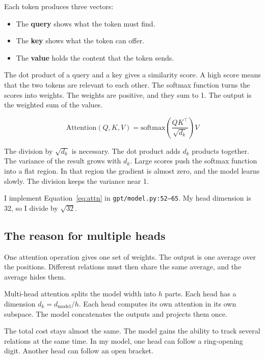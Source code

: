 \documentclass[11pt,a4paper]{article}
\newcommand{\code}[1]{\texttt{#1}}
\begin{document}
Each token produces three vectors:

\begin{itemize}[nosep,leftmargin=1.4em]
  \item The \textbf{query} shows what the token must find.
  \item The \textbf{key} shows what the token can offer.
  \item The \textbf{value} holds the content that the token sends.
\end{itemize}

The dot product of a query and a key gives a similarity score. A high score means that the two
tokens are relevant to each other. The softmax function turns the scores into weights. The
weights are positive, and they sum to 1. The output is the weighted sum of the values.

\begin{equation}
\mathrm{Attention}(Q,K,V) = \mathrm{softmax}\!\left(\frac{QK^{\top}}{\sqrt{d_k}}\right)V
\label{eq:attn}
\end{equation}

The division by $\sqrt{d_k}$ is necessary. The dot product adds $d_k$ products together. The
variance of the result grows with $d_k$. Large scores push the softmax function into a flat
region. In that region the gradient is almost zero, and the model learns slowly. The division
keeps the variance near 1.

I implement Equation~\ref{eq:attn} in \code{gpt/model.py:52--65}. My head dimension is 32, so I
divide by $\sqrt{32}$.

\subsection{The reason for multiple heads}

One attention operation gives one set of weights. The output is one average over the positions.
Different relations must then share the same average, and the average hides them.

Multi-head attention splits the model width into $h$ parts. Each head has a dimension
$d_k = d_{\text{model}}/h$. Each head computes its own attention in its own subspace. The model
concatenates the outputs and projects them once.

The total cost stays almost the same. The model gains the ability to track several relations at
the same time. In my model, one head can follow a ring-opening digit. Another head can follow an
open bracket.
\end{document}
